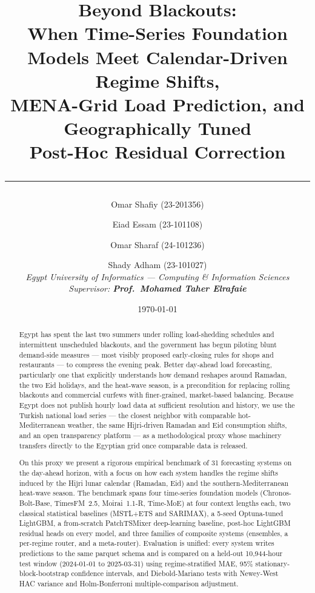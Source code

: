 \documentclass[10pt, a4paper, twocolumn]{article}
\title{
  \vspace*{-1cm}
  \textbf{\Large Beyond Blackouts:}\\[4pt]
  \textbf{\large When Time-Series Foundation Models Meet Calendar-Driven Regime Shifts,}\\
  \textbf{\large MENA-Grid Load Prediction, and Geographically Tuned}\\
  \textbf{\large Post-Hoc Residual Correction}\\[6pt]
  \rule{0.85\textwidth}{0.4pt}
}
\author{
  Omar Shafiy (23-201356) \and
  Eiad Essam (23-101108) \and
  Omar Sharaf (24-101236) \and
  Shady Adham (23-101027) \\[4pt]
  \small\itshape Egypt University of Informatics --- Computing \& Information Sciences \\
  \small\itshape Supervisor: \textbf{Prof.\ Mohamed Taher Elrafaie}
}
\date{\today}
\begin{document}

\maketitle
\thispagestyle{empty}

\begin{abstract}
\noindent
Egypt has spent the last two summers under rolling load-shedding
schedules and intermittent unscheduled blackouts, and the
government has begun piloting blunt demand-side measures --- most
visibly proposed early-closing rules for shops and restaurants ---
to compress the evening peak. Better day-ahead load forecasting,
particularly one that explicitly understands how demand reshapes
around Ramadan, the two Eid holidays, and the heat-wave season,
is a precondition for replacing rolling blackouts and commercial
curfews with finer-grained, market-based balancing. Because Egypt
does not publish hourly load data at sufficient resolution and
history, we use the Turkish national load series --- the closest
neighbor with comparable hot-Mediterranean weather, the same
Hijri-driven Ramadan and Eid consumption shifts, and an open
transparency platform --- as a methodological proxy whose
machinery transfers directly to the Egyptian grid once comparable
data is released.

On this proxy we present a rigorous empirical benchmark of
\num{31} forecasting systems on the day-ahead horizon, with a focus
on how each system handles the regime shifts induced by the Hijri
lunar calendar (Ramadan, Eid) and the southern-Mediterranean
heat-wave season. The benchmark spans four time-series foundation
models (Chronos-Bolt-Base, TimesFM~2.5, Moirai~1.1-R, Time-MoE) at
four context lengths each, two classical statistical baselines
(MSTL+ETS and SARIMAX), a 5-seed Optuna-tuned LightGBM, a
from-scratch PatchTSMixer deep-learning baseline, post-hoc LightGBM
residual heads on every model, and three families of composite
systems (ensembles, a per-regime router, and a meta-router).
Evaluation is unified: every system writes predictions to the same
parquet schema and is compared on a held-out 10{,}944-hour test
window (2024-01-01 to 2025-03-31) using regime-stratified MAE,
95\% stationary-block-bootstrap confidence intervals, and
Diebold-Mariano tests with Newey-West HAC variance and
Holm-Bonferroni multiple-comparison adjustment.


\end{abstract}
\end{document}
